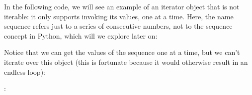 \documentclass[a4paper,10pt,english]{sphinxmanual}
\begin{document}
In the following code, we will see an example of an iterator object that is not iterable: it
only supports invoking its values, one at a time. Here, the name sequence refers just to a
series of consecutive numbers, not to the sequence concept in Python, which will we
explore later on:

\begin{sphinxVerbatim}[commandchars=\\\{\}]
 
       
          
          

     
          
          
         
\end{sphinxVerbatim}

Notice that we can get the values of the sequence one at a time, but we can’t iterate over this
object (this is fortunate because it would otherwise result in an endless loop):

\begin{sphinxVerbatim}[commandchars=\\\{\}]
   
    
: 
\end{sphinxVerbatim}
\end{document}
